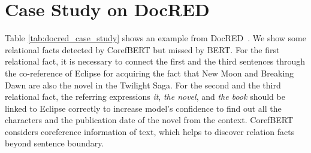 \documentclass[11pt,a4paper]{article}
\newcommand\BASESIZE{\xspace}
\begin{document}
\section{Case Study on DocRED}
Table \ref{tab:docred_case_study} shows an example from DocRED~\citep{DocRED}.  We show some relational facts detected by CorefBERT\BASESIZE but missed by BERT\BASESIZE. 
For the first relational fact, it is necessary to connect the first and the third sentences through the co-reference of Eclipse for acquiring the fact that New Moon and Breaking Dawn are also the novel in the Twilight Saga. 
For the second and the third relational fact, the referring expressions \emph{it}, \emph{the novel}, and \emph{the book} should be linked to {Eclipse} correctly to increase model's confidence to find out all the characters and the publication date of the novel from the context. CorefBERT considers coreference information of text, which helps to discover relation facts beyond sentence boundary.
\end{document}
